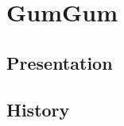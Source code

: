 \section{GumGum}
    \subsection{Presentation}
        
    
    \subsection{History}
        
\newpage